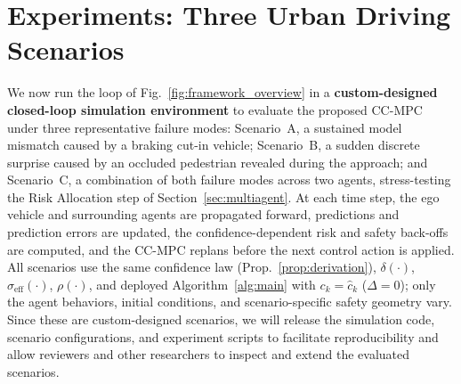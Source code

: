 \documentclass[letterpaper, 10 pt, conference]{ieeeconf}
\begin{document}
\section{Experiments: Three Urban Driving Scenarios}
\label{sec:sim}

We now run the loop of Fig.~\ref{fig:framework_overview} in a \textbf{custom-designed closed-loop simulation environment} to evaluate the proposed CC-MPC under three representative failure modes: Scenario~A, a sustained model mismatch caused by a braking cut-in vehicle; Scenario~B, a sudden discrete surprise caused by an occluded pedestrian revealed during the approach; and Scenario~C, a combination of both failure modes across two agents, stress-testing the Risk Allocation step of Section~\ref{sec:multiagent}. At each time step, the ego vehicle and surrounding agents are propagated forward, predictions and prediction errors are updated, the confidence-dependent risk and safety back-offs are computed, and the CC-MPC replans before the next control action is applied. All scenarios use the same confidence law (Prop.~\ref{prop:derivation}), $\delta(\cdot)$, $\sigma_{\mathrm{eff}}(\cdot)$, $\rho(\cdot)$, and deployed Algorithm~\ref{alg:main} with $c_k=\hat c_k$ ($\Delta=0$); only the agent behaviors, initial conditions, and scenario-specific safety geometry vary. Since these are custom-designed scenarios, we will release the simulation code, scenario configurations, and experiment scripts to facilitate reproducibility and allow reviewers and other researchers to inspect and extend the evaluated scenarios.
\end{document}
